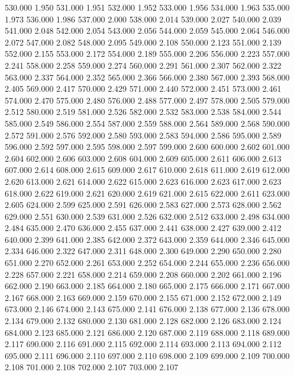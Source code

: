 530.000 1.950 
531.000 1.951 
532.000 1.952 
533.000 1.956 
534.000 1.963 
535.000 1.973 
536.000 1.986 
537.000 2.000 
538.000 2.014 
539.000 2.027 
540.000 2.039 
541.000 2.048 
542.000 2.054 
543.000 2.056 
544.000 2.059 
545.000 2.064 
546.000 2.072 
547.000 2.082 
548.000 2.095 
549.000 2.108 
550.000 2.123 
551.000 2.139 
552.000 2.155 
553.000 2.172 
554.000 2.189 
555.000 2.206 
556.000 2.223 
557.000 2.241 
558.000 2.258 
559.000 2.274 
560.000 2.291 
561.000 2.307 
562.000 2.322 
563.000 2.337 
564.000 2.352 
565.000 2.366 
566.000 2.380 
567.000 2.393 
568.000 2.405 
569.000 2.417 
570.000 2.429 
571.000 2.440 
572.000 2.451 
573.000 2.461 
574.000 2.470 
575.000 2.480 
576.000 2.488 
577.000 2.497 
578.000 2.505 
579.000 2.512 
580.000 2.519 
581.000 2.526 
582.000 2.532 
583.000 2.538 
584.000 2.544 
585.000 2.549 
586.000 2.554 
587.000 2.559 
588.000 2.564 
589.000 2.568 
590.000 2.572 
591.000 2.576 
592.000 2.580 
593.000 2.583 
594.000 2.586 
595.000 2.589 
596.000 2.592 
597.000 2.595 
598.000 2.597 
599.000 2.600 
600.000 2.602 
601.000 2.604 
602.000 2.606 
603.000 2.608 
604.000 2.609 
605.000 2.611 
606.000 2.613 
607.000 2.614 
608.000 2.615 
609.000 2.617 
610.000 2.618 
611.000 2.619 
612.000 2.620 
613.000 2.621 
614.000 2.622 
615.000 2.623 
616.000 2.623 
617.000 2.623 
618.000 2.622 
619.000 2.621 
620.000 2.619 
621.000 2.615 
622.000 2.611 
623.000 2.605 
624.000 2.599 
625.000 2.591 
626.000 2.583 
627.000 2.573 
628.000 2.562 
629.000 2.551 
630.000 2.539 
631.000 2.526 
632.000 2.512 
633.000 2.498 
634.000 2.484 
635.000 2.470 
636.000 2.455 
637.000 2.441 
638.000 2.427 
639.000 2.412 
640.000 2.399 
641.000 2.385 
642.000 2.372 
643.000 2.359 
644.000 2.346 
645.000 2.334 
646.000 2.322 
647.000 2.311 
648.000 2.300 
649.000 2.290 
650.000 2.280 
651.000 2.270 
652.000 2.261 
653.000 2.252 
654.000 2.244 
655.000 2.236 
656.000 2.228 
657.000 2.221 
658.000 2.214 
659.000 2.208 
660.000 2.202 
661.000 2.196 
662.000 2.190 
663.000 2.185 
664.000 2.180 
665.000 2.175 
666.000 2.171 
667.000 2.167 
668.000 2.163 
669.000 2.159 
670.000 2.155 
671.000 2.152 
672.000 2.149 
673.000 2.146 
674.000 2.143 
675.000 2.141 
676.000 2.138 
677.000 2.136 
678.000 2.134 
679.000 2.132 
680.000 2.130 
681.000 2.128 
682.000 2.126 
683.000 2.124 
684.000 2.123 
685.000 2.121 
686.000 2.120 
687.000 2.119 
688.000 2.118 
689.000 2.117 
690.000 2.116 
691.000 2.115 
692.000 2.114 
693.000 2.113 
694.000 2.112 
695.000 2.111 
696.000 2.110 
697.000 2.110 
698.000 2.109 
699.000 2.109 
700.000 2.108 
701.000 2.108 
702.000 2.107 
703.000 2.107 
